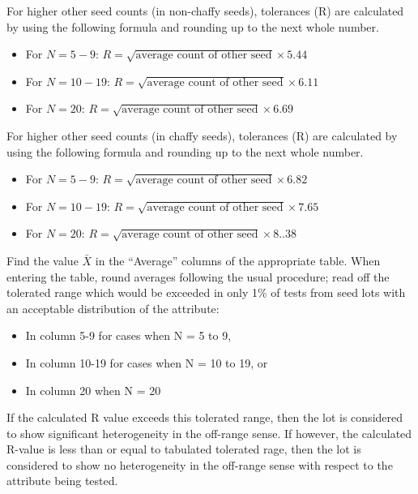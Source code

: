 \documentclass[
]{book}
\providecommand{\tightlist}{%
  \setlength{\itemsep}{0pt}\setlength{\parskip}{0pt}}
\begin{document}
For higher other seed counts (in non-chaffy seeds), tolerances (R) are calculated by using the following formula and rounding up to the next whole number.

\begin{itemize}
\tightlist
\item
  For \(N = 5-9\): \(R = \sqrt{\textrm{average count of other seed}} \times 5.44\)
\item
  For \(N = 10-19\): \(R = \sqrt{\textrm{average count of other seed}} \times 6.11\)
\item
  For \(N = 20\): \(R = \sqrt{\textrm{average count of other seed}} \times 6.69\)
\end{itemize}

For higher other seed counts (in chaffy seeds), tolerances (R) are calculated by using the following formula and rounding up to the next whole number.

\begin{itemize}
\tightlist
\item
  For \(N = 5-9\): \(R = \sqrt{\textrm{average count of other seed}} \times 6.82\)
\item
  For \(N = 10-19\): \(R = \sqrt{\textrm{average count of other seed}} \times 7.65\)
\item
  For \(N = 20\): \(R = \sqrt{\textrm{average count of other seed}} \times 8..38\)
\end{itemize}

Find the value \(\bar{X}\) in the ``Average'' columns of the appropriate table. When entering the table, round averages following the usual procedure; read off the tolerated range which would be exceeded in only 1\% of tests from seed lots with an acceptable distribution of the attribute:

\begin{itemize}
\tightlist
\item
  In column 5-9 for cases when N = 5 to 9,
\item
  In column 10-19 for cases when N = 10 to 19, or
\item
  In column 20 when N = 20
\end{itemize}

If the calculated R value exceeds this tolerated range, then the lot is considered to show significant heterogeneity in the off-range sense. If however, the calculated R-value is less than or equal to tabulated tolerated rage, then the lot is considered to show no heterogeneity in the off-range sense with respect to the attribute being tested.
\end{document}
